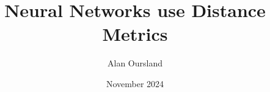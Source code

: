 \documentclass[11pt]{article}
\title{Neural Networks use Distance Metrics}
\author{Alan Oursland}
\affil{\textit{alan.oursland@gmail.com}}
\date{November 2024}
\begin{document}
\maketitle

\begin{abstract}

\end{abstract}


% 
% 
% 
% 
% 
% 




\appendix

% 

% 
\end{document}
